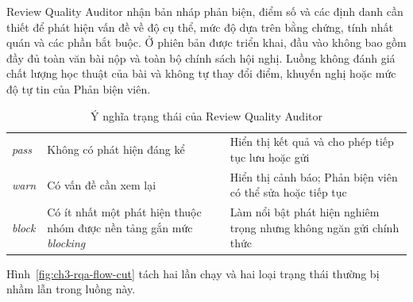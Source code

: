 Review Quality Auditor nhận bản nháp phản biện, điểm số và các định danh cần thiết để phát hiện vấn đề về độ cụ thể, mức độ dựa trên bằng chứng, tính nhất quán và các phần bắt buộc. Ở phiên bản được triển khai, đầu vào không bao gồm đầy đủ toàn văn bài nộp và toàn bộ chính sách hội nghị. Luồng không đánh giá chất lượng học thuật của bài và không tự thay đổi điểm, khuyến nghị hoặc mức độ tự tin của Phản biện viên.

\begin{table}[H]
  \centering
  \caption{Ý nghĩa trạng thái của Review Quality Auditor}
  \label{tab:ch3-rqa-states-cut}
  \setlength{\tabcolsep}{2pt}
  \renewcommand{\arraystretch}{1.15}
  \begin{tabularx}{\textwidth}{|P{0.14\textwidth}|Y|Y|}
    \hline
     &  &  \\ \hline
    \textit{pass} & Không có phát hiện đáng kể & Hiển thị kết quả và cho phép tiếp tục lưu hoặc gửi \\ \hline
    \textit{warn} & Có vấn đề cần xem lại & Hiển thị cảnh báo; Phản biện viên có thể sửa hoặc tiếp tục \\ \hline
    \textit{block} & Có ít nhất một phát hiện thuộc nhóm được nền tảng gắn mức \textit{blocking} & Làm nổi bật phát hiện nghiêm trọng nhưng không ngăn gửi chính thức \\ \hline
  \end{tabularx}
\end{table}

Hình~\ref{fig:ch3-rqa-flow-cut} tách hai lần chạy và hai loại trạng thái thường bị nhầm lẫn trong luồng này.

